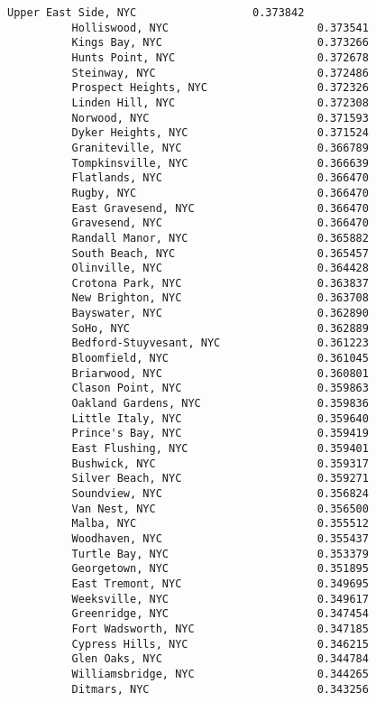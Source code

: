 \documentclass[11pt]{article}
\begin{document}
\begin{Verbatim}[commandchars=\\\{\}]
          Upper East Side, NYC                  0.373842
          Holliswood, NYC                       0.373541
          Kings Bay, NYC                        0.373266
          Hunts Point, NYC                      0.372678
          Steinway, NYC                         0.372486
          Prospect Heights, NYC                 0.372326
          Linden Hill, NYC                      0.372308
          Norwood, NYC                          0.371593
          Dyker Heights, NYC                    0.371524
          Graniteville, NYC                     0.366789
          Tompkinsville, NYC                    0.366639
          Flatlands, NYC                        0.366470
          Rugby, NYC                            0.366470
          East Gravesend, NYC                   0.366470
          Gravesend, NYC                        0.366470
          Randall Manor, NYC                    0.365882
          South Beach, NYC                      0.365457
          Olinville, NYC                        0.364428
          Crotona Park, NYC                     0.363837
          New Brighton, NYC                     0.363708
          Bayswater, NYC                        0.362890
          SoHo, NYC                             0.362889
          Bedford-Stuyvesant, NYC               0.361223
          Bloomfield, NYC                       0.361045
          Briarwood, NYC                        0.360801
          Clason Point, NYC                     0.359863
          Oakland Gardens, NYC                  0.359836
          Little Italy, NYC                     0.359640
          Prince's Bay, NYC                     0.359419
          East Flushing, NYC                    0.359401
          Bushwick, NYC                         0.359317
          Silver Beach, NYC                     0.359271
          Soundview, NYC                        0.356824
          Van Nest, NYC                         0.356500
          Malba, NYC                            0.355512
          Woodhaven, NYC                        0.355437
          Turtle Bay, NYC                       0.353379
          Georgetown, NYC                       0.351895
          East Tremont, NYC                     0.349695
          Weeksville, NYC                       0.349617
          Greenridge, NYC                       0.347454
          Fort Wadsworth, NYC                   0.347185
          Cypress Hills, NYC                    0.346215
          Glen Oaks, NYC                        0.344784
          Williamsbridge, NYC                   0.344265
          Ditmars, NYC                          0.343256

\end{Verbatim}
\end{document}
